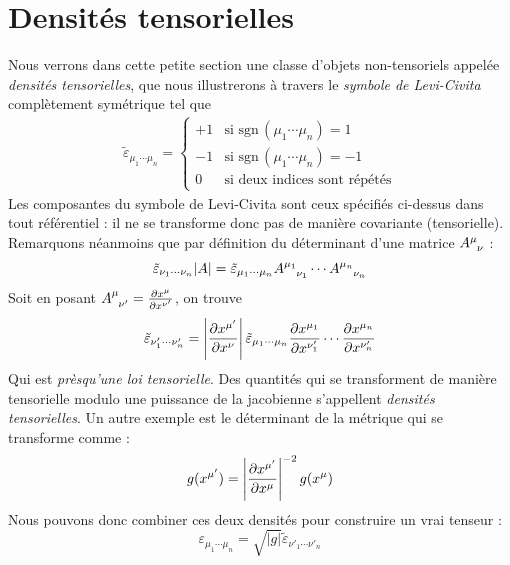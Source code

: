 \section{Densités tensorielles}
Nous verrons dans cette petite section une classe d'objets non-tensoriels appelée \emph{densités tensorielles}, que nous illustrerons à travers le \emph{symbole de Levi-Civita} complètement symétrique tel que
\begin{align}
    \tilde{\varepsilon}_{{\mu_1} \cdots {\mu_n}} = \left\{
    \begin{array}{cl}
        +1 & \text{si } \mathrm{sgn} \, (\mu_1\cdots \mu_n) =1 \\
        -1 & \text{si } \mathrm{sgn} \, (\mu_1\cdots \mu_n) =-1\\
        0 & \text{si deux indices sont répétés}
    \end{array}\right.
\end{align}
Les composantes du symbole de Levi-Civita sont ceux spécifiés ci-dessus dans tout référentiel : il ne se transforme donc pas de manière covariante (tensorielle). Remarquons néanmoins que par définition du déterminant d'une matrice $A\indices{^\mu_\nu}$ : 
\begin{equation}
    \tilde{\varepsilon}_{{\nu_1} \cdots {\nu_n}} \lvert A \rvert = \tilde{\varepsilon}_{{\mu_1} \cdots {\mu_n}} A\indices{^{\mu_1} _{\nu_1}} \cdots A\indices{^{\mu_n} _{\nu_n}}
\end{equation}
Soit en posant $A\indices{^\mu_{\nu'}} = \frac{\pd x^\mu}{\pd x^{\nu'} }$, on trouve
\begin{equation}
    \tilde{\varepsilon}_{{\nu'_1} \cdots {\nu'_n}} = \left| \frac{\partial x^{\mu'}}{\partial x^{\nu}} \right|  \tilde{\varepsilon}_{{\mu_1} \cdots {\mu_n}} \frac{\partial x^{\mu_1}}{\partial x^{\nu_1'} } \cdots \frac{\partial x^{\mu_n}}{\partial x^{\nu'_n} }
\end{equation}
Qui est \emph{prèsqu'une loi tensorielle}. Des quantités qui se transforment de manière tensorielle modulo une puissance de la jacobienne s'appellent \emph{densités tensorielles}. Un autre exemple est le déterminant de la métrique qui se transforme comme :
\begin{equation}
    g(x^{\mu'}) = \left| \frac{\partial x^{\mu'}}{\partial x^{\mu}} \right|^{-2} g(x^\mu)
\end{equation}
Nous pouvons donc combiner ces deux densités pour construire un vrai tenseur : 
\begin{equation}
    \varepsilon_{{\mu_1} \cdots {\mu_n}} = \sqrt{\lvert g\rvert} \tilde{\varepsilon}_{{\nu'_1} \cdots {\nu'_n}}
\end{equation}
